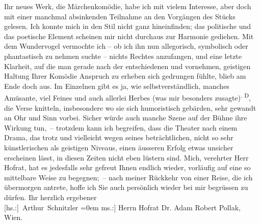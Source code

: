 \begin{ledgroupsized}[t]{13cm}
           Ihr neues Werk, die Märchenkomödie, habe ich mit
               vielem Interesse, aber doch mit einer manchmal absinkenden Teilnahme an den Vorgängen
               des Stücks gelesen. Ich konnte mich in den Stil nicht ganz hineinfinden; das
               politische und das poetische Element scheinen mir nicht durchaus zur Harmonie
               gediehen. Mit dem Wundervogel vermochte ich – ob ich ihn nun allegorisch, symbolisch
               oder phantastisch zu nehmen suchte – nichts Rechtes anzufangen, und eine letzte
               Klarheit, auf die man gerade nach der entschiedenen und vornehmen, geistigen Haltung
               Ihrer Komödie Anspruch zu erheben sich gedrungen fühlte, blieb am Ende doch aus. Im
               Einzelnen gibt es ja, wie selbstverständlich, manches Amüsante, viel Feines und auch
               allerlei Herbes (was mir besonders zusagte)\substVorne{}\textsuperscript{. D}\substDazwischen{}, d\substHinten{}ie Verse knitteln, insbesondere wo sie sich humoristisch gebärden, sehr
               gewandt an Ohr und Sinn vorbei. Sicher würde auch manche Szene auf der Bühne ihre
               Wirkung tun, – trotzdem kann ich begreifen, dass die Theater nach einem Drama, das trotz  und vielleicht wegen seines beträchtlichen,
               nicht so sehr künstlerischen als geistigen Niveaus, einen äusseren Erfolg etwas
               unsicher erscheinen lässt, in diesen Zeiten nicht eben lüstern sind.\pend
           \pstart
           Mich, verehrter Herr Hofrat, hat es jedesfalls sehr gefreut Ihnen endlich wieder,
               vorläufig auf eine so mittelbare Weise zu begegnen; – nach meiner Rückkehr von einer
               Reise, die ich übermorgen antrete, hoffe ich Sie auch persönlich wieder bei mir
               begrüssen zu dürfen.\pend
           \pstart
           Ihr herzlich ergebener{\\[\baselineskip]}\spacefill\mbox{{[}hs.:{]} Arthur Schnitzler}\pend
           \leftskip=0em{}\pstart
           \noindent{}{[}ms.:{]} Herrn Hofrat Dr. Adam Robert Pollak,{\\}Wien.\pend
           
         
         \endnumbering{}\end{ledgroupsized}  \newcommand{\dateiname}{L02498}\newcommand{\titel}{Arthur Schnitzler an Robert Adam, 10. 4. 1928}\newcommand{\editorInnen}{Martin Anton Müller und Gerd-Hermann Susen}
      